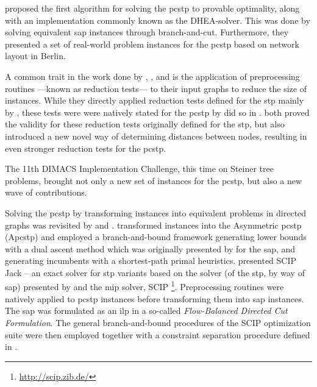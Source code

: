  \citet{ljubic2005solving} proposed the first algorithm for solving the \gls{pcstp} to provable optimality, along with an
 implementation commonly known as the DHEA-solver.
 This was done by solving
 equivalent \gls{sap} instances through branch-and-cut.
 Furthermore, they presented a set of real-world problem instances for the \gls{pcstp} based on network layout in Berlin.

 A common trait in the work done by
 \citet{lucena2004strong}, \citet{Ljubic:2004:memetic}, and \citet{ljubic2005solving}
 is the application of preprocessing routines
  ---known as reduction tests--- to their input graphs to reduce the size of instances.
  While they directly applied reduction tests
  defined for the \gls{stp} mainly by \citet{duin1989edge,duin1989reduction},
  these tests were were natively stated for the \gls{pcstp}
  by \citet{uchoa2006reduction} did so in \citeyear{uchoa2006reduction}.
  \citeauthor{uchoa2006reduction} both proved the validity
  for these reduction tests originally defined for the \gls{stp},
  but also introduced a new
  novel way of determining distances between nodes, resulting in
  even stronger reduction tests for the \gls{pcstp}.

  The 11th DIMACS Implementation Challenge\citep{DIMACS}, this time on Steiner tree problems,
  brought not only a new set of instances for the \gls{pcstp}, but
  also a new wave of contributions.

  Solving the \gls{pcstp} by transforming instances into equivalent problems in directed graphs
  was revisited by \citet{leitner2016dual} and \citet{gamrath2017scip}.
  \citet{leitner2016dual} transformed instances into the Asymmetric \gls{pcstp} (A\gls{pcstp})
  and employed a
  branch-and-bound framework generating lower bounds with a dual ascent method which was originally presented by \citet{wong1984dual} for the \gls{sap}, and
  generating incumbents with
  a shortest-path primal heuristics.
  \citet{gamrath2017scip} presented SCIP Jack -- an exact solver for \gls{stp} variants based on the solver (of the \gls{stp}, by way of \gls{sap}) presented by
  \citet{koch1998solving} and the \gls{mip} solver, SCIP \footnote{\url{http://scip.zib.de/}}\citep{GleixnerEtal2017OO}.
  Preprocessing routines were natively applied to \gls{pcstp} instances before transforming them into \gls{sap} instances.
  The \gls{sap} was formulated as an
  \gls{ilp} in a so-called \textit{Flow-Balanced Directed Cut Formulation}. The general branch-and-bound
  procedures of the SCIP optimization suite were
  then employed together with a constraint separation procedure defined in \citet{koch1998solving}.

